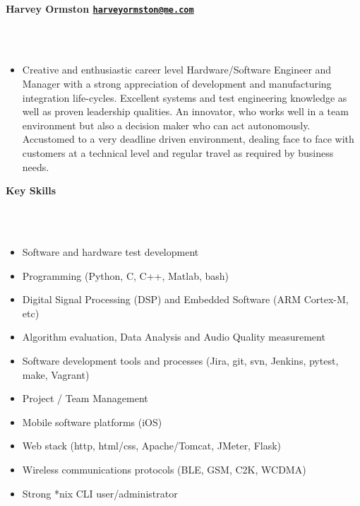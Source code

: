 \documentclass[a4paper,10pt]{article}
\newcommand{\lsep}{-0.5cm}
\newcommand{\resheading}[1]{{\small \colorbox{mygrey}{\begin{minipage}{0.975\textwidth}{\textbf{#1 \vphantom{p\^{E}}}}\end{minipage}}}}
\begin{document}
\hspace{0.5cm}\\[-0.2cm]


\resheading{\textbf{Harvey Ormston \hfill{\href{mailto:harveyormston@me.com}{\nolinkurl{harveyormston@me.com}}}}}\\[\lsep]
\\
\begin{itemize}[align=left]
\item[]Creative and enthusiastic career level Hardware/Software Engineer and
  Manager with a strong appreciation of development and manufacturing
    integration life-cycles. Excellent systems and test engineering knowledge as
    well as proven leadership qualities. An innovator, who works well in a team
    environment but also a decision maker who can act autonomously. Accustomed
    to a very deadline driven environment, dealing face to face with customers
    at a technical level and regular travel as required by business needs.
\\
\end{itemize}

\resheading{\textbf{Key Skills}}\\[\lsep]
\\
\begin{itemize}[label=\FilledSmallSquare, leftmargin=50pt]
\item Software and hardware test development
\item Programming (Python, C, C++, Matlab, bash)
\item Digital Signal Processing (DSP) and Embedded Software (ARM Cortex-M, etc)
\item Algorithm evaluation, Data Analysis and Audio Quality measurement
\item Software development tools and processes (Jira, git, svn, Jenkins, pytest, make, Vagrant)
\item Project / Team Management
\item Mobile software platforms (iOS)
\item Web stack (http, html/css, Apache/Tomcat, JMeter, Flask)
\item Wireless communications protocols (BLE, GSM, C2K, WCDMA)
\item Strong *nix CLI user/administrator
\\
\end{itemize}
\end{document}

